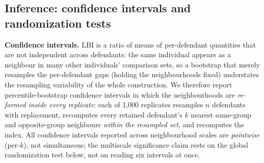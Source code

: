 \documentclass[11pt]{article}
\begin{document}
\subsection{Inference: confidence intervals and randomization tests}
\label{sec:inference}

\textbf{Confidence intervals.} LBI is a ratio of means of
per-defendant quantities that are not independent across defendants:
the same individual appears as a neighbour in many other individuals'
comparison sets, so a bootstrap that merely resamples the
per-defendant gaps (holding the neighbourhoods fixed) understates the
resampling variability of the whole construction. We therefore report
percentile-bootstrap confidence intervals in which the neighbourhoods
are \emph{re-formed inside every replicate}: each of 1{,}000
replicates resamples $n$ defendants with replacement, recomputes every
retained defendant's $k$ nearest same-group and opposite-group
neighbours \emph{within the resampled set}, and recomputes the index.
All confidence intervals reported across neighbourhood scales are
\emph{pointwise} (per-$k$), not simultaneous; the multiscale
significance claim rests on the global randomization test below, not
on reading six intervals at once.
\end{document}
